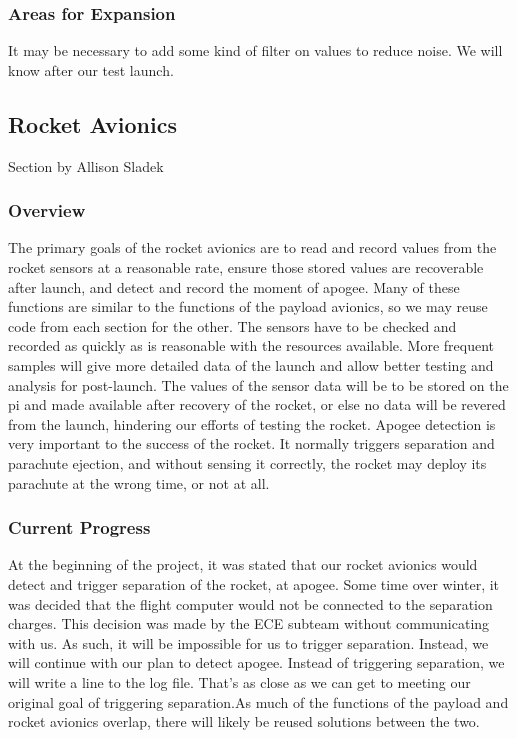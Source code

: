\documentclass[onecolumn, draftclsnofoot, 10pt, compsoc]{IEEEtran}
\begin{document}
\subsubsection{Areas for Expansion}
It may be necessary to add some kind of filter on values to reduce noise. We will know after our test launch.
\subsection{Rocket Avionics}
Section by Allison Sladek
\subsubsection{Overview}
The primary goals of the rocket avionics are to read and record values from the rocket sensors at a reasonable rate, ensure those stored values are recoverable after launch, and detect and record the moment of apogee. 
Many of these functions are similar to the functions of the payload avionics, so we may reuse code from each section for the other. 
The sensors have to be checked and recorded as quickly as is reasonable with the resources available.
More frequent samples will give more detailed data of the launch and allow better testing and analysis for post-launch. 
The values of the sensor data will be to be stored on the pi and made available after recovery of the rocket, or else no data will be revered from the launch, hindering our efforts of testing the rocket.
Apogee detection is very important to the success of the rocket. It normally triggers separation and parachute ejection, and without sensing it correctly, the rocket may deploy its parachute at the wrong time, or not at all. 

\subsubsection{Current Progress}
At the beginning of the project, it was stated that our rocket avionics would detect and trigger separation of the rocket, at apogee.  
Some time over winter, it was decided that the flight computer would not be connected to the separation charges.  
This decision was made by the ECE subteam without communicating with us.  As such, it will be impossible for us to trigger separation.
Instead, we will continue with our plan to detect apogee.  Instead of triggering separation, we will write a line to the log file.  That's as close as we can get to meeting our original goal of triggering separation.As much of the functions of the payload and rocket avionics overlap, there will likely be reused solutions between the two. 
\end{document}
